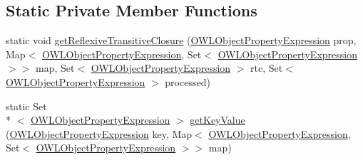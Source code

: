 \subsection*{Static Private Member Functions}
\begin{DoxyCompactItemize}
\item 
static void \hyperlink{classorg_1_1semanticweb_1_1owlapi_1_1util_1_1_o_w_l_object_property_manager_a478b12c6e14479844aa0d05d95aef0ec}{get\-Reflexive\-Transitive\-Closure} (\hyperlink{interfaceorg_1_1semanticweb_1_1owlapi_1_1model_1_1_o_w_l_object_property_expression}{O\-W\-L\-Object\-Property\-Expression} prop, Map$<$ \hyperlink{interfaceorg_1_1semanticweb_1_1owlapi_1_1model_1_1_o_w_l_object_property_expression}{O\-W\-L\-Object\-Property\-Expression}, Set$<$ \hyperlink{interfaceorg_1_1semanticweb_1_1owlapi_1_1model_1_1_o_w_l_object_property_expression}{O\-W\-L\-Object\-Property\-Expression} $>$$>$ map, Set$<$ \hyperlink{interfaceorg_1_1semanticweb_1_1owlapi_1_1model_1_1_o_w_l_object_property_expression}{O\-W\-L\-Object\-Property\-Expression} $>$ rtc, Set$<$ \hyperlink{interfaceorg_1_1semanticweb_1_1owlapi_1_1model_1_1_o_w_l_object_property_expression}{O\-W\-L\-Object\-Property\-Expression} $>$ processed)
\item 
static Set\\*
$<$ \hyperlink{interfaceorg_1_1semanticweb_1_1owlapi_1_1model_1_1_o_w_l_object_property_expression}{O\-W\-L\-Object\-Property\-Expression} $>$ \hyperlink{classorg_1_1semanticweb_1_1owlapi_1_1util_1_1_o_w_l_object_property_manager_a2f811e124e4bd2be4bb677f1601dfd0b}{get\-Key\-Value} (\hyperlink{interfaceorg_1_1semanticweb_1_1owlapi_1_1model_1_1_o_w_l_object_property_expression}{O\-W\-L\-Object\-Property\-Expression} key, Map$<$ \hyperlink{interfaceorg_1_1semanticweb_1_1owlapi_1_1model_1_1_o_w_l_object_property_expression}{O\-W\-L\-Object\-Property\-Expression}, Set$<$ \hyperlink{interfaceorg_1_1semanticweb_1_1owlapi_1_1model_1_1_o_w_l_object_property_expression}{O\-W\-L\-Object\-Property\-Expression} $>$$>$ map)
\end{DoxyCompactItemize}
